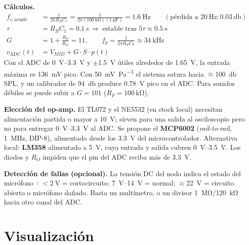 \documentclass[11pt,a4paper]{article}
\begin{document}
\textbf{Cálculos.}
\begin{align}
  f_{c,\text{acople}} &= \frac{1}{2\pi R_B C_1} = \frac{1}{2\pi(\SI{100}{\kilo\ohm})(\SI{1}{\micro\farad})} = \SI{1.6}{\hertz}
  \qquad (\text{pérdida a } \SI{20}{\hertz}: \SI{0.03}{\decibel}) \\
  \tau &= R_B C_1 = \SI{0.1}{\second}\ \Rightarrow\ \text{estable tras } 5\tau \approx \SI{0.5}{\second} \\
  G &= 1 + \frac{R_F}{R_G} = 11, \qquad f_{p} = \frac{1}{2\pi R_F C_F} \approx \SI{34}{\kilo\hertz} \\
  v_{\text{ADC}}(t) &= V_{MID} + G\cdot S\cdot p(t)
\end{align}
Con el ADC de \SIrange{0}{3.3}{\volt} y $\pm$\SI{1.5}{\volt} útiles alrededor de \SI{1.65}{\volt}, la entrada máxima es
\SI{136}{\milli\volt} pico. Con \SI{50}{\milli\volt\per\pascal} el sistema satura hacia $\approx$\SI{100}{\decibel} SPL, y un
calibrador de \SI{94}{\decibel} produce \SI{0.78}{\volt} pico en el ADC. Para sonidos débiles se puede subir a $G=101$
($R_F=\SI{100}{\kilo\ohm}$).

\textbf{Elección del op-amp.} El TL072 y el NE5532 (en stock local) necesitan alimentación partida o mayor a
\SI{10}{\volt}; sirven para una salida al osciloscopio pero no para entregar \SIrange{0}{3.3}{\volt} al ADC. Se propone el
\textbf{MCP6002} (\emph{rail-to-rail}, \SI{1}{\mega\hertz}, DIP-8), alimentado desde los \SI{3.3}{\volt} del microcontrolador.
Alternativa local: \textbf{LM358} alimentado a \SI{5}{\volt}, cuya entrada y salida cubren \SIrange{0}{3.5}{\volt}.
Los diodos y $R_O$ impiden que el pin del ADC reciba más de \SI{3.3}{\volt}.

\textbf{Detección de fallas (opcional).} La tensión DC del nodo indica el estado del micrófono~\cite{hbk,tida010249}:
$<\SI{2}{\volt}$ = cortocircuito; \SIrange{7}{14}{\volt} = normal; $\approx$\SI{22}{\volt} = circuito abierto o micrófono dañado.
Basta un multímetro, o un divisor \SI{1}{\mega\ohm}/\SI{120}{\kilo\ohm} hacia otro canal del ADC.

\section{Visualización}
\end{document}
